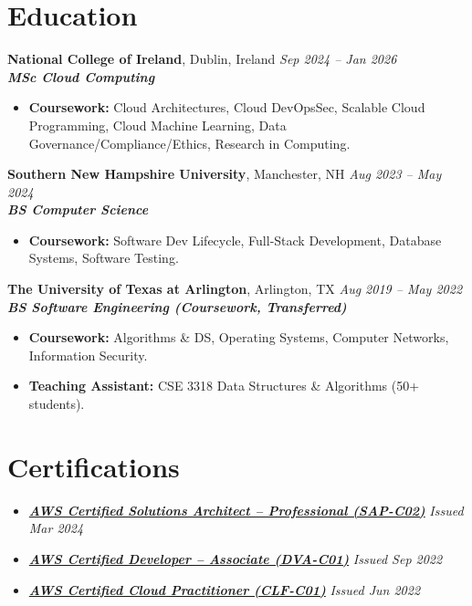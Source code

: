 \documentclass[10pt,a4paper]{article}
\begin{document}
\section*{Education}
\textbf{National College of Ireland}, Dublin, Ireland \hfill \textit{Sep 2024 -- Jan 2026}\\[-0.15em]
\textbf{\textit{MSc Cloud Computing}}\\[-0.25em]
\begin{itemize}
  \item \textbf{Coursework:} Cloud Architectures, Cloud DevOpsSec, Scalable Cloud Programming, Cloud Machine Learning, Data Governance/Compliance/Ethics, Research in Computing.
\end{itemize}
\vspace{0.20em}
\textbf{Southern New Hampshire University}, Manchester, NH \hfill \textit{Aug 2023 -- May 2024}\\[-0.15em]
\textbf{\textit{BS Computer Science}}\\[-0.25em]
\begin{itemize}
  \item \textbf{Coursework:} Software Dev Lifecycle, Full-Stack Development, Database Systems, Software Testing.
\end{itemize}
\vspace{0.20em}
\textbf{The University of Texas at Arlington}, Arlington, TX \hfill \textit{Aug 2019 -- May 2022}\\[-0.15em]
\textbf{\textit{BS Software Engineering (Coursework, Transferred)}}\\[-0.25em]
\begin{itemize}
  \item \textbf{Coursework:} Algorithms \& DS, Operating Systems, Computer Networks, Information Security.
  \item \textbf{Teaching Assistant:} CSE 3318 Data Structures \& Algorithms (50+ students).
\end{itemize}

\section*{Certifications}
\begin{itemize}
  \item \href{https://www.credly.com/badges/6e22a6c0-9922-49d5-b59f-34cc593c82c3/public_url}{\textbf{\textit{AWS Certified Solutions Architect -- Professional (SAP-C02)}}} \hfill \textit{Issued Mar 2024}
  \item \href{https://www.credly.com/badges/84671bf4-ce9f-4d8b-a0de-0ef606ad5646/public_url}{\textbf{\textit{AWS Certified Developer -- Associate (DVA-C01)}}} \hfill \textit{Issued Sep 2022}
  \item \href{https://www.credly.com/badges/e671b9de-e72a-48cb-82fc-33776c285174/public_url}{\textbf{\textit{AWS Certified Cloud Practitioner (CLF-C01)}}} \hfill \textit{Issued Jun 2022}
\end{itemize}
\end{document}
